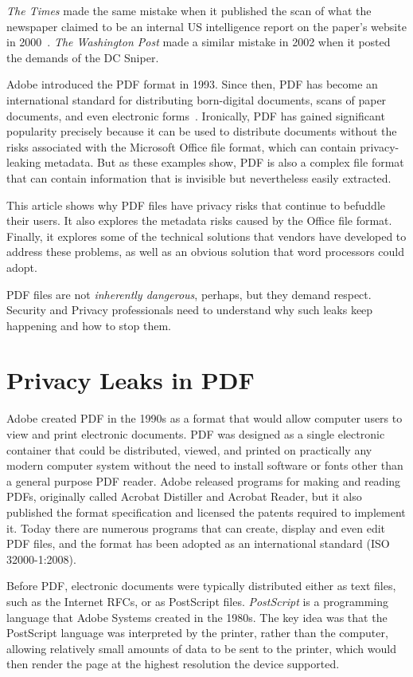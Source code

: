 \emph{The Times}  made the
same mistake when it published the scan of what the newspaper claimed
to be an internal US intelligence report on the paper's
website in 2000~\cite{nyt-unediting-2003}. \emph{The Washington Post}
  made a similar mistake in 2002 when it posted the demands of the DC Sniper\cite{internet-forensics}.

Adobe introduced the PDF format in 1993. Since then, PDF has become an
international standard for distributing born-digital documents, scans
of paper documents, and even electronic forms~\cite{ISO32000-1:2008}. Ironically, PDF has
gained significant popularity precisely because it can be used to 
distribute documents without the  risks associated with the
Microsoft Office file format, which can contain
privacy-leaking metadata. But as these examples show, PDF is also a complex file
format that can  contain information that is invisible but
nevertheless easily extracted.

This article shows
why PDF files have privacy risks that continue to befuddle their
users. It also explores the
metadata risks caused by the Office file format. Finally, it explores
some of the technical solutions that vendors have developed to address
these problems, as well as an obvious solution that 
word processors could adopt.

PDF files are not \emph{inherently dangerous}, perhaps, but they
demand respect. Security and Privacy professionals need to
understand why such leaks keep happening and how to stop them.

\section{Privacy Leaks in PDF}

Adobe created PDF in the 1990s as a format that would allow computer
users to view and print electronic documents. PDF was designed as a
single electronic container that could be distributed, viewed, and
printed on practically any modern computer system without the need to
install  software or fonts other than a general purpose PDF
reader. Adobe released programs for making and reading PDFs,
originally called Acrobat Distiller and Acrobat Reader, but it also
published the format specification and licensed the patents required
to implement it. Today there are numerous programs that can create,
display and even edit PDF files, and the format has been adopted as an
international standard (ISO 32000-1:2008).

Before PDF, electronic documents were typically distributed either as text
files, such as the Internet RFCs, or as PostScript
files. \emph{PostScript} is a programming language that Adobe Systems
created in the 1980s. The key idea 
was that the PostScript language was interpreted by the printer, rather than 
the computer, allowing relatively small amounts of data to be sent to
the printer, which would then render the page at the highest resolution
the device supported. 


